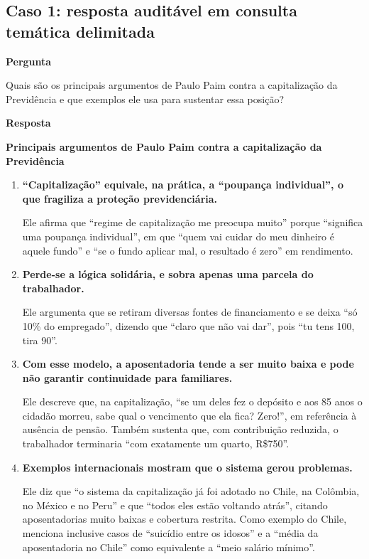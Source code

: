 \subsection{Caso 1: resposta auditável em consulta temática delimitada}\label{sec:anexo-caso-bom}

\textbf{Pergunta}

Quais são os principais argumentos de Paulo Paim contra a capitalização da Previdência e que exemplos ele usa para sustentar essa posição?

\textbf{Resposta}

\textbf{Principais argumentos de Paulo Paim contra a capitalização da Previdência}

\begin{enumerate}
  \item \textbf{``Capitalização'' equivale, na prática, a ``poupança individual'', o que fragiliza a proteção previdenciária.}

  Ele afirma que ``regime de capitalização me preocupa muito'' porque ``significa uma poupança individual'', em que ``quem vai cuidar do meu dinheiro é aquele fundo'' e ``se o fundo aplicar mal, o resultado é zero'' em rendimento.

  \item \textbf{Perde-se a lógica solidária, e sobra apenas uma parcela do trabalhador.}

  Ele argumenta que se retiram diversas fontes de financiamento e se deixa ``só 10\% do empregado'', dizendo que ``claro que não vai dar'', pois ``tu tens 100, tira 90''.

  \item \textbf{Com esse modelo, a aposentadoria tende a ser muito baixa e pode não garantir continuidade para familiares.}

  Ele descreve que, na capitalização, ``se um deles fez o depósito e aos 85 anos o cidadão morreu, sabe qual o vencimento que ela fica? Zero!'', em referência à ausência de pensão. Também sustenta que, com contribuição reduzida, o trabalhador terminaria ``com exatamente um quarto, R\$750''.

  \item \textbf{Exemplos internacionais mostram que o sistema gerou problemas.}

  Ele diz que ``o sistema da capitalização já foi adotado no Chile, na Colômbia, no México e no Peru'' e que ``todos eles estão voltando atrás'', citando aposentadorias muito baixas e cobertura restrita. Como exemplo do Chile, menciona inclusive casos de ``suicídio entre os idosos'' e a ``média da aposentadoria no Chile'' como equivalente a ``meio salário mínimo''.


\end{enumerate}

